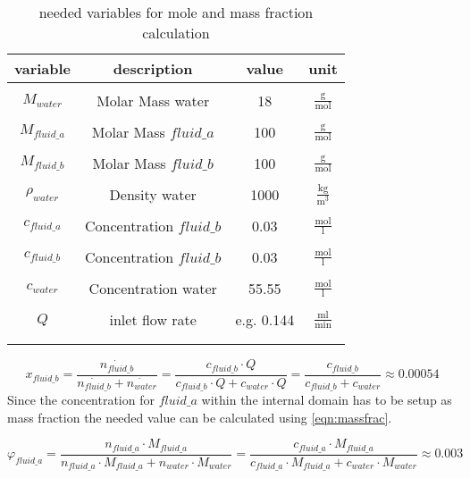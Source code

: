 \documentclass[../thesis.tex]{subfiles}
\begin{document}
\begin{table} [htb]
	\centering
	\caption{needed variables for mole and mass fraction calculation}
	\begin{tabular}{ cccc }
		\hline
		variable & description & value & unit \\
		\hline
		\\[-1em]
		$M_{water}$ & Molar Mass water & 18 & $\frac{\mathrm{g}}{\mathrm{mol}}$ \\
		\\[-1em]
		$M_{fluid\_a}$ & Molar Mass $fluid\_a$ & 100 & $\frac{\mathrm{g}}{\mathrm{mol}}$ \\
		\\[-1em]
		$M_{fluid\_b}$ & Molar Mass $fluid\_b$ & 100 & $\frac{\mathrm{g}}{\mathrm{mol}}$ \\
		\\[-1em]
		$\rho_{water}$ & Density water & 1000 & $\frac{\mathrm{kg}}{\mathrm{m}^3}$ \\
		\\[-1em]
		$c_{fluid\_a}$ & Concentration $fluid\_b$ & 0.03 & $\frac{\mathrm{mol}}{\mathrm{l}}$ \\
		\\[-1em]
		$c_{fluid\_b}$ & Concentration $fluid\_b$ & 0.03 & $\frac{\mathrm{mol}}{\mathrm{l}}$ \\
		\\[-1em]
		$c_{water}$ & Concentration water & 55.55 & $\frac{\mathrm{mol}}{\mathrm{l}}$ \\
		\\[-1em]
		$Q$ & inlet flow rate &  e.g. 0.144 & $\frac{\mathrm{ml}}{\mathrm{min}}$ \\
		\\[-1em]
		\hline
		\label{tab:ansys_setup_molefrac}
	\end{tabular}
\end{table}

\begin{equation}
	\label{eqn:molefrac}
	x_{fluid\_b} =\dfrac{\dot{n_{fluid\_b}}}{\dot{n_{fluid\_b}} + \dot{n_{water}}} = \dfrac{c_{fluid\_b} \cdot Q}{c_{fluid\_b} \cdot Q + c_{water} \cdot Q} = \dfrac{c_{fluid\_b}}{c_{fluid\_b} + c_{water}} \approx 0 \text{.}00054
\end{equation}
Since the concentration for $fluid\_{a}$ within the internal domain has to be setup as mass fraction the needed value can be calculated using \autoref{eqn:massfrac}.

\begin{equation}
	\label{eqn:massfrac}
	\varphi_{fluid\_a} =\dfrac{n_{fluid\_a} \cdot M_{fluid\_a}}{n_{fluid\_a} \cdot M_{fluid\_a} + n_{water} \cdot M_{water}} = \dfrac{c_{fluid\_a} \cdot M_{fluid\_a}}{c_{fluid\_a} \cdot M_{fluid\_a} + c_{water} \cdot M_{water}} \approx \text{0.003}
\end{equation}
\end{document}
